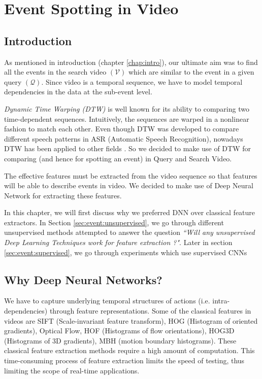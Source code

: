 \chapter{Event Spotting in Video}
\label{chap:event}

\section{Introduction}
As mentioned in introduction (chapter \ref{chap:intro}), our ultimate aim was to find all the events in the search video $(\mathcal{V})$ which are similar to the event in a given query $(\mathcal{Q})$.  Since video is a temporal sequence, we have to model temporal dependencies in the data at the sub-event level.

\textit{Dynamic Time Warping (DTW)} is well known for its ability to comparing two time-dependent sequences.  Intuitively, the sequences are warped in a nonlinear fashion to match each other.  Even though DTW was developed to compare different speech patterns in ASR (Automatic Speech Recognition), nowadays DTW has been applied to other fields \cite{muller2007information}.  So we decided to make use of DTW for comparing (and hence for spotting an event) in Query and Search Video.

The effective features must be extracted from the video sequence so that features will be able to describe events in video.  We decided to make use of Deep Neural Network for extracting these features.

In this chapter, we will first discuss why we preferred  DNN over classical feature extractors.  In Section \ref{sec:event:unsupervised}, we go through different unsupervised methods attempted to answer the question \textit{``Will any unsupervised Deep Learning Techniques work for feature extraction ?"}.  Later in section \ref{sec:event:supervised}, we go through experiments which use supervised CNNs  

\section{Why Deep Neural Networks?}
\label{sec:event:why}
We have to capture underlying temporal structures of actions (i.e.  intra-dependencies) through feature representations.  Some of the classical features in videos are SIFT (Scale-invariant feature transform), HOG (Histogram of oriented gradients), Optical Flow, HOF (Histograms of flow orientations), HOG3D (Histograms of 3D gradients), MBH (motion boundary histograms).  These classical feature extraction methods require a high amount of computation\cite{baker2011database,chatfield2011devil}.  This time-consuming process of feature extraction limits the speed of testing, thus limiting the scope of real-time applications.

